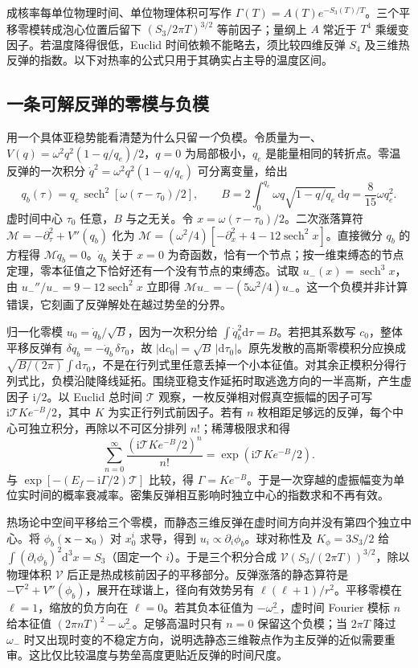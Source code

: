 成核率每单位物理时间、单位物理体积可写作 $\Gamma(T)=A(T)e^{-S_3(T)/T}$。三个平移零模转成泡心位置后留下 $(S_3/2\pi T)^{3/2}$ 等前因子；量纲上 $A$ 常近于 $T^4$ 乘缓变因子。若温度降得很低，Euclid 时间依赖不能略去，须比较四维反弹 $S_4$ 及三维热反弹的指数。以下对热率的公式只用于其确实占主导的温度区间。


\subsection{一条可解反弹的零模与负模}

用一个具体亚稳势能看清楚为什么只留\emph{一个}负模。令质量为一、$V(q)=\omega^2q^2(1-q/q_e)/2$，$q=0$ 为局部极小，$q_e$ 是能量相同的转折点。零温反弹的一次积分 $\dot q^2=\omega^2q^2(1-q/q_e)$ 可分离变量，给出
\[
 q_b(\tau)=q_e\,\operatorname{sech}^2[\omega(\tau-\tau_0)/2],\qquad
 B=2\int_0^{q_e}\omega q\sqrt{1-q/q_e}\,\mathrm dq
   =\frac{8}{15}\omega q_e^2.
\]
虚时间中心 $\tau_0$ 任意，$B$ 与之无关。令 $x=\omega(\tau-\tau_0)/2$。二次涨落算符 $\mathcal M=-\partial_\tau^2+V''(q_b)$ 化为
$\mathcal M=(\omega^2/4)[-\partial_x^2+4-12\operatorname{sech}^2x]$。直接微分 $q_b$ 的方程得 $\mathcal M\dot q_b=0$。$\dot q_b$ 关于 $x=0$ 为奇函数，恰有一个节点；按一维束缚态的节点定理，零本征值之下恰好还有一个没有节点的束缚态。试取 $u_-(x)=\operatorname{sech}^3x$，由
$u_-''/u_-=9-12\operatorname{sech}^2x$ 立即得 $\mathcal M u_-=-(5\omega^2/4)u_-$。这一个负模并非计算错误，它刻画了反弹解处在越过势垒的分界。

归一化零模 $u_0=\dot q_b/\sqrt B$，因为一次积分给 $\int\dot q_b^2\mathrm d\tau=B$。若把其系数写 $c_0$，整体平移反弹有 $\delta q_b=-\dot q_b\,\delta\tau_0$，故 $|\mathrm dc_0|=\sqrt B\,|\mathrm d\tau_0|$。原先发散的高斯零模积分应换成 $\sqrt{B/(2\pi)}\int\mathrm d\tau_0$，不是在行列式里任意丢掉一个小本征值。对其余正模积分得行列式比，负模沿陡降线延拓。围绕亚稳支作延拓时取逃逸方向的一半高斯，产生虚因子 $\mathrm i/2$。以 Euclid 总时间 $\mathcal T$ 观察，一枚反弹相对假真空振幅的因子可写 $\mathrm i\mathcal T K e^{-B}/2$，其中 $K$ 为实正行列式前因子。若有 $n$ 枚相距足够远的反弹，每个中心可独立积分，再除以不可区分排列 $n!$；稀薄极限求和得
\[
 \sum_{n=0}^\infty\frac{(\mathrm i\mathcal T K e^{-B}/2)^n}{n!}
 =\exp(\mathrm i\mathcal T K e^{-B}/2).
\]
与 $\exp[-(E_f-\mathrm i\Gamma/2)\mathcal T]$ 比较，得 $\Gamma=Ke^{-B}$。于是一次穿越的虚振幅变为单位实时间的概率衰减率。密集反弹相互影响时独立中心的指数求和不再有效。

热场论中空间平移给三个零模，而静态三维反弹在虚时间方向并没有第四个独立中心。将 $\phi_b(\bm x-\bm x_0)$ 对 $x_0^i$ 求导，得到 $u_i\propto\partial_i\phi_b$。球对称性及 $K_\phi=3S_3/2$ 给 $\int(\partial_i\phi_b)^2\mathrm d^3x=S_3$（固定一个 $i$）。于是三个积分合成 $\mathcal V(S_3/(2\pi T))^{3/2}$，除以物理体积 $\mathcal V$ 后正是热成核前因子的平移部分。反弹涨落的静态算符是 $-\nabla^2+V''(\phi_b)$，展开在球谐上，径向有效势另有 $\ell(\ell+1)/r^2$。平移零模在 $\ell=1$，缩放的负方向在 $\ell=0$。若其负本征值为 $-\omega_-^2$，虚时间 Fourier 模标 $n$ 给本征值 $(2\pi nT)^2-\omega_-^2$。足够高温时只有 $n=0$ 保留这个负模；当 $2\pi T$ 降过 $\omega_-$ 时又出现时变的不稳定方向，说明选静态三维鞍点作为主反弹的近似需要重审。这比仅比较温度与势垒高度更贴近反弹的时间尺度。
